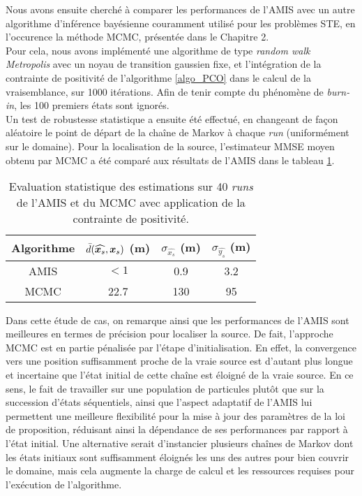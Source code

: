 Nous avons ensuite cherché à comparer les performances de l'AMIS avec un autre algorithme d'inférence bayésienne couramment utilisé pour les problèmes STE, en l'occurence la méthode MCMC, présentée dans le Chapitre 2. \\

Pour cela, nous avons implémenté une algorithme de type \textit{random walk Metropolis}  avec un noyau de transition gaussien fixe, et l'intégration de la contrainte de positivité de l'algorithme \ref{algo_PCO} dans le calcul de la vraisemblance, sur 1000 itérations. Afin de tenir compte du phénomène de \textit{burn-in}, les 100 premiers états sont ignorés. \\

Un test de robustesse statistique a ensuite été effectué, en changeant de façon aléatoire le point de départ de la chaîne de Markov à chaque \textit{run} (uniformément sur le domaine). Pour la localisation de la source, l'estimateur MMSE moyen obtenu par MCMC a été comparé aux résultats de l'AMIS dans le tableau \ref{table_2_AE}. \\

    \begin{table}[h!]
    	\centering
    	
    	\begin{tabular}{cccc}
    		
    		Algorithme &{ $\bar{d}(\widehat{{\bm{x}_s}},{\bm{x}_s})$ (m)}& $\sigma_{\widehat{x_s}}$ (m)& $\sigma_{\widehat{y_s}}$ (m)\\
    		\hline
    		AMIS                   & {$<1$}  	& 0.9        & 3.2        \\
    		MCMC                   & {22.7}  & 130        & 95 \\      
    		\hline
    	\end{tabular}
    	\caption{Evaluation statistique des estimations sur 40 \textit{runs} de l'AMIS et du MCMC avec application de la contrainte de positivité.}
    	\label{table_2_AE}
    \end{table}
    
 Dans cette étude de cas, on remarque ainsi que les performances de l'AMIS sont meilleures en termes de précision pour localiser la source. De fait, l'approche MCMC est en partie pénalisée par l'étape d'initialisation. En effet, la convergence vers une position suffisamment proche de la vraie source est d'autant plus longue et incertaine que l'état initial de cette chaîne est éloigné de la vraie source. En ce sens, le fait de travailler sur une population de particules plutôt que sur la succession d'états séquentiels, ainsi que l'aspect adaptatif de l'AMIS lui permettent une meilleure flexibilité pour la mise à jour des paramètres de la loi de proposition, réduisant ainsi la dépendance de ses performances par rapport à l'état initial. Une alternative serait d'instancier plusieurs chaînes de Markov dont les états initiaux sont suffisamment éloignés les uns des autres pour bien couvrir le domaine, mais cela augmente la charge de calcul et les ressources requises pour l'exécution de l'algorithme. \\
 

